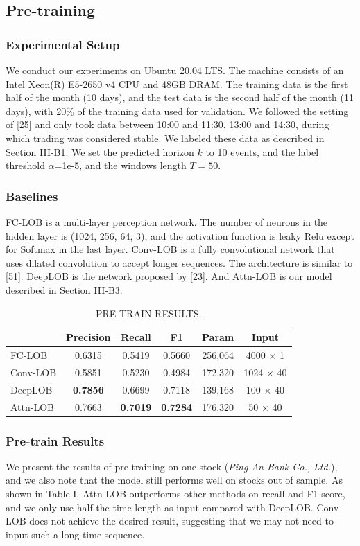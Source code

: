 \documentclass[conference]{IEEEtran}
\begin{document}
\subsection{Pre-training}

\subsubsection{Experimental Setup}
We conduct our experiments on Ubuntu 20.04 LTS. The machine consists of an Intel Xeon(R) E5-2650 v4 CPU and 48GB DRAM. The training data is the first half of the month (10 days), and the test data is the second half of the month (11 days), with 20\% of the training data used for validation. We followed the setting of [25] and only took data between 10:00 and 11:30, 13:00 and 14:30, during which trading was considered stable. We labeled these data as described in Section III-B1. We set the predicted horizon $k$ to 10 events, and the label threshold $\alpha$=1e-5, and the windows length $T = 50$.

\subsubsection{Baselines}
FC-LOB is a multi-layer perception network. The number of neurons in the hidden layer is (1024, 256, 64, 3), and the activation function is leaky Relu except for Softmax in the last layer. Conv-LOB is a fully convolutional network that uses dilated convolution to accept longer sequences. The architecture is similar to [51]. DeepLOB is the network proposed by [23]. And Attn-LOB is our model described in Section III-B3.

\begin{table}[h]
\centering
\caption{PRE-TRAIN RESULTS.}
\begin{tabular}{lccccc}
\hline
 & Precision & Recall & F1 & Param & Input \\ \hline
FC-LOB & 0.6315 & 0.5419 & 0.5660 & 256,064 & 4000 $\times$ 1 \\
Conv-LOB & 0.5851 & 0.5230 & 0.4984 & 172,320 & 1024 $\times$ 40 \\
DeepLOB & \textbf{0.7856} & 0.6699 & 0.7118 & 139,168 & 100 $\times$ 40 \\
Attn-LOB & 0.7663 & \textbf{0.7019} & \textbf{0.7284} & 176,320 & 50 $\times$ 40 \\ \hline
\end{tabular}
\end{table}

\subsubsection{Pre-train Results}
We present the results of pre-training on one stock (\textit{Ping An Bank Co., Ltd.}), and we also note that the model still performs well on stocks out of sample. As shown in Table I, Attn-LOB outperforms other methods on recall and F1 score, and we only use half the time length as input compared with DeepLOB. Conv-LOB does not achieve the desired result, suggesting that we may not need to input such a long time sequence.
\end{document}
